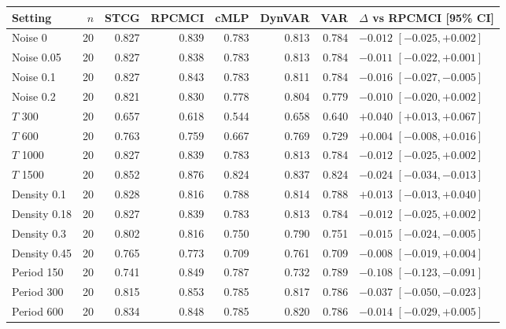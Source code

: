 \begin{tabular}{lrrrrrrl}
\toprule
Setting & $n$ & STCG & RPCMCI & cMLP & DynVAR & VAR & $\Delta$ vs RPCMCI [95\% CI] \\
\midrule
Noise 0 & 20 & 0.827 & 0.839 & 0.783 & 0.813 & 0.784 & $-0.012$ $[-0.025,+0.002]$ \\
Noise 0.05 & 20 & 0.827 & 0.838 & 0.783 & 0.813 & 0.784 & $-0.011$ $[-0.022,+0.001]$ \\
Noise 0.1 & 20 & 0.827 & 0.843 & 0.783 & 0.811 & 0.784 & $-0.016$ $[-0.027,-0.005]$ \\
Noise 0.2 & 20 & 0.821 & 0.830 & 0.778 & 0.804 & 0.779 & $-0.010$ $[-0.020,+0.002]$ \\
$T$ 300 & 20 & 0.657 & 0.618 & 0.544 & 0.658 & 0.640 & $+0.040$ $[+0.013,+0.067]$ \\
$T$ 600 & 20 & 0.763 & 0.759 & 0.667 & 0.769 & 0.729 & $+0.004$ $[-0.008,+0.016]$ \\
$T$ 1000 & 20 & 0.827 & 0.839 & 0.783 & 0.813 & 0.784 & $-0.012$ $[-0.025,+0.002]$ \\
$T$ 1500 & 20 & 0.852 & 0.876 & 0.824 & 0.837 & 0.824 & $-0.024$ $[-0.034,-0.013]$ \\
Density 0.1 & 20 & 0.828 & 0.816 & 0.788 & 0.814 & 0.788 & $+0.013$ $[-0.013,+0.040]$ \\
Density 0.18 & 20 & 0.827 & 0.839 & 0.783 & 0.813 & 0.784 & $-0.012$ $[-0.025,+0.002]$ \\
Density 0.3 & 20 & 0.802 & 0.816 & 0.750 & 0.790 & 0.751 & $-0.015$ $[-0.024,-0.005]$ \\
Density 0.45 & 20 & 0.765 & 0.773 & 0.709 & 0.761 & 0.709 & $-0.008$ $[-0.019,+0.004]$ \\
Period 150 & 20 & 0.741 & 0.849 & 0.787 & 0.732 & 0.789 & $-0.108$ $[-0.123,-0.091]$ \\
Period 300 & 20 & 0.815 & 0.853 & 0.785 & 0.817 & 0.786 & $-0.037$ $[-0.050,-0.023]$ \\
Period 600 & 20 & 0.834 & 0.848 & 0.785 & 0.820 & 0.786 & $-0.014$ $[-0.029,+0.005]$ \\
\bottomrule
\end{tabular}
